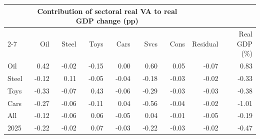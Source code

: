 \begin{tabular}{lrrrrrrrr}
\toprule
 & \multicolumn{6}{c}{Contribution of sectoral real VA to real GDP change (pp)} & & \\
\cmidrule(lr){2-7}
 & Oil & Steel & Toys & Cars & Svcs & Cons & Residual & Real GDP (\%) \\
\midrule
Oil & 0.42 & -0.02 & -0.15 & 0.00 & 0.60 & 0.05 & -0.07 & 0.83 \\
Steel & -0.12 & 0.11 & -0.05 & -0.04 & -0.18 & -0.03 & -0.02 & -0.33 \\
Toys & -0.33 & -0.07 & 0.43 & -0.06 & -0.29 & -0.03 & -0.03 & -0.38 \\
Cars & -0.27 & -0.06 & -0.11 & 0.04 & -0.56 & -0.04 & -0.02 & -1.01 \\
All & -0.12 & -0.06 & 0.06 & -0.05 & 0.04 & -0.01 & -0.05 & -0.19 \\
2025 & -0.22 & -0.02 & 0.07 & -0.03 & -0.22 & -0.03 & -0.02 & -0.47 \\
\bottomrule
\end{tabular}

